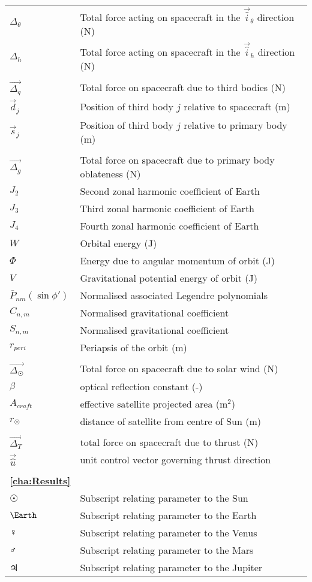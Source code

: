\begin{longtable}{l p{}}
$\Delta_\theta$ & Total force acting on spacecraft in the $\vec{\hat{i}}_\theta$ direction (N) \\
$\Delta_h$ & Total force acting on spacecraft in the $\vec{\hat{i}}_h$ direction (N) \\
\\
$\vec{\Delta_q}$ & Total force on spacecraft due to third bodies (N) \\
$\vec{d}_j$ & Position of third body $j$ relative to spacecraft (m) \\
$\vec{s}_j$ & Position of third body $j$ relative to primary body (m) \\
\\
$\vec{\Delta_g}$ & Total force on spacecraft due to primary body oblateness (N) \\
$J_2$ & Second zonal harmonic coefficient of Earth\\
$J_3$ & Third zonal harmonic coefficient of Earth\\
$J_4$ & Fourth zonal harmonic coefficient of Earth\\
$W$ & Orbital energy (J) \\
$\Phi$ & Energy due to angular momentum of orbit (J) \\
$V$ & Gravitational potential energy of orbit (J) \\
$\bar{P}_{nm}\left(\sin\phi'\right)$ & Normalised associated Legendre polynomials\\
$C_{n,m}$ & Normalised gravitational coefficient \\
$S_{n,m}$ & Normalised gravitational coefficient \\
$r_{peri}$ & Periapsis of the orbit (m) \\
\\
$\vec{\Delta_\Sun}$ & Total force on spacecraft due to solar wind (N) \\
$\beta$ & optical reflection constant (-) \\
$A_{craft}$ & effective satellite projected area (m$^2$)\\
$r_\Sun$ & distance of satellite from centre of Sun (m) \\
\\
$\vec{\Delta_T}$ & total force on spacecraft due to thrust (N) \\
$\vec{\hat{u}}$ & unit control vector governing thrust direction \\
\\
\textbf{\autoref{cha:Results}}
\\
$\Sun$ & Subscript relating parameter to the Sun \\
$\Earth$ & Subscript relating parameter to the Earth \\
$\Venus$ & Subscript relating parameter to the Venus \\
$\Mars$ & Subscript relating parameter to the Mars \\
$\Jupiter$ & Subscript relating parameter to the Jupiter 




\end{longtable}
